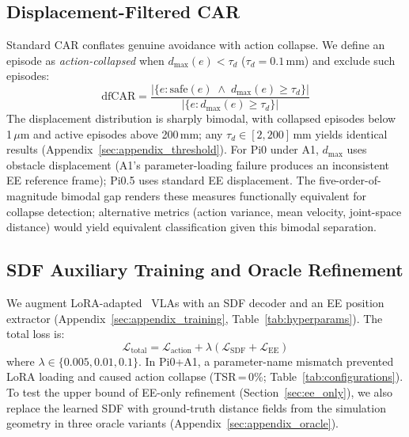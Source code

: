 \subsection{Displacement-Filtered CAR}\label{sec:dfcar}

Standard CAR conflates genuine avoidance with action collapse. We define an episode as \emph{action-collapsed} when $d_{\max}(e) < \tau_d$ ($\tau_d = 0.1$\,mm) and exclude such episodes:
\begin{equation}\label{eq:car_f}
\text{dfCAR} = \frac{|\{e : \text{safe}(e) \;\land\; d_{\max}(e) \geq \tau_d\}|}{|\{e : d_{\max}(e) \geq \tau_d\}|}
\end{equation}
The displacement distribution is sharply bimodal, with collapsed episodes below 1\,$\mu$m and active episodes above 200\,mm; any $\tau_d \in [2, 200]$\,mm yields identical results (Appendix~\ref{sec:appendix_threshold}). For Pi0 under A1, $d_{\max}$ uses obstacle displacement (A1's parameter-loading failure produces an inconsistent EE reference frame); Pi0.5 uses standard EE displacement. The five-order-of-magnitude bimodal gap renders these measures functionally equivalent for collapse detection; alternative metrics (action variance, mean velocity, joint-space distance) would yield equivalent classification given this bimodal separation.

\subsection{SDF Auxiliary Training and Oracle Refinement}\label{sec:sdf_aux}

We augment LoRA-adapted~\cite{hu2022lora} VLAs with an SDF decoder and an EE position extractor (Appendix~\ref{sec:appendix_training}, Table~\ref{tab:hyperparams}). The total loss is:
\begin{equation}\label{eq:total_loss}
\mathcal{L}_\text{total} = \mathcal{L}_\text{action} + \lambda \left( \mathcal{L}_\text{SDF} + \mathcal{L}_\text{EE} \right)
\end{equation}
where $\lambda \in \{0.005, 0.01, 0.1\}$. In Pi0+A1, a parameter-name mismatch prevented LoRA loading and caused action collapse (TSR\,=\,0\%; Table~\ref{tab:configurations}). To test the upper bound of EE-only refinement (Section~\ref{sec:ee_only}), we also replace the learned SDF with ground-truth distance fields from the simulation geometry in three oracle variants (Appendix~\ref{sec:appendix_oracle}).\label{sec:oracle_setup}
